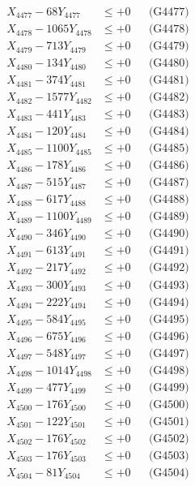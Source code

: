 \documentclass[a4paper,10pt]{article}
\begin{document}
{\begin{align}
X_{4477} - 68Y_{4477} &\leq +0 && \text{(G4477)} \\
X_{4478} - 1065Y_{4478} &\leq +0 && \text{(G4478)} \\
X_{4479} - 713Y_{4479} &\leq +0 && \text{(G4479)} \\
X_{4480} - 134Y_{4480} &\leq +0 && \text{(G4480)} \\
\allowbreak
X_{4481} - 374Y_{4481} &\leq +0 && \text{(G4481)} \\
X_{4482} - 1577Y_{4482} &\leq +0 && \text{(G4482)} \\
X_{4483} - 441Y_{4483} &\leq +0 && \text{(G4483)} \\
X_{4484} - 120Y_{4484} &\leq +0 && \text{(G4484)} \\
X_{4485} - 1100Y_{4485} &\leq +0 && \text{(G4485)} \\
X_{4486} - 178Y_{4486} &\leq +0 && \text{(G4486)} \\
X_{4487} - 515Y_{4487} &\leq +0 && \text{(G4487)} \\
X_{4488} - 617Y_{4488} &\leq +0 && \text{(G4488)} \\
X_{4489} - 1100Y_{4489} &\leq +0 && \text{(G4489)} \\
X_{4490} - 346Y_{4490} &\leq +0 && \text{(G4490)} \\
\allowbreak
X_{4491} - 613Y_{4491} &\leq +0 && \text{(G4491)} \\
X_{4492} - 217Y_{4492} &\leq +0 && \text{(G4492)} \\
X_{4493} - 300Y_{4493} &\leq +0 && \text{(G4493)} \\
X_{4494} - 222Y_{4494} &\leq +0 && \text{(G4494)} \\
X_{4495} - 584Y_{4495} &\leq +0 && \text{(G4495)} \\
X_{4496} - 675Y_{4496} &\leq +0 && \text{(G4496)} \\
X_{4497} - 548Y_{4497} &\leq +0 && \text{(G4497)} \\
X_{4498} - 1014Y_{4498} &\leq +0 && \text{(G4498)} \\
X_{4499} - 477Y_{4499} &\leq +0 && \text{(G4499)} \\
X_{4500} - 176Y_{4500} &\leq +0 && \text{(G4500)} \\
\allowbreak
X_{4501} - 122Y_{4501} &\leq +0 && \text{(G4501)} \\
X_{4502} - 176Y_{4502} &\leq +0 && \text{(G4502)} \\
X_{4503} - 176Y_{4503} &\leq +0 && \text{(G4503)} \\
X_{4504} - 81Y_{4504} &\leq +0 && \text{(G4504)} \\

\end{align}}
\end{document}
